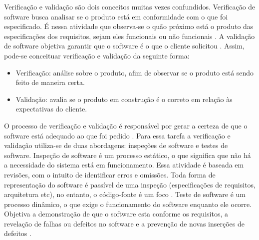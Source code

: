 \par
\indent Verificação e validação são dois conceitos muitas vezes confundidos. Verificação de software busca analisar se o produto está em conformidade com o que foi especificado. É nessa atividade que observa-se o quão próximo está o produto das especificações dos requisitos, sejam eles funcionais ou não funcionais \cite{sommerville2007}. A validação de software objetiva garantir que o software é o que o cliente solicitou \cite{sommerville2007}. Assim, pode-se conceituar verificação e validação da seguinte forma:
\begin{itemize}
\item Verificação: análise sobre o produto, afim de observar se o produto está sendo feito de maneira certa.
\item Validação: avalia se o produto em construção é o correto em relação às expectativas do cliente.
\end{itemize}
\par
\indent O processo de verificação e validação é responsável por gerar a certeza de que o software está adequado ao que foi pedido \cite{sommerville2007}. Para essa tarefa a verificação e validação utiliza-se de duas abordagens: inspeções de software e testes de software. Inspeção de software é um processo estático, o que significa que não há a necessidade do sistema está em funcionamento. Essa atividade é baseada em revisões, com o intuito de identificar erros e omissões. Toda forma de representação do software é passível de uma inspeção (especificações de requisitos, arquitetura etc), no entanto, o código-fonte é um foco \cite{sommerville2007}. Teste de software é um processo dinâmico, o que exige o funcionamento do software enquanto ele ocorre. Objetiva a demonstração de que o software esta conforme os requisitos, a revelação de falhas ou defeitos no software \cite{sommerville2007} e a prevenção de novas inserções de defeitos \cite{burkeCoyner2003}.

